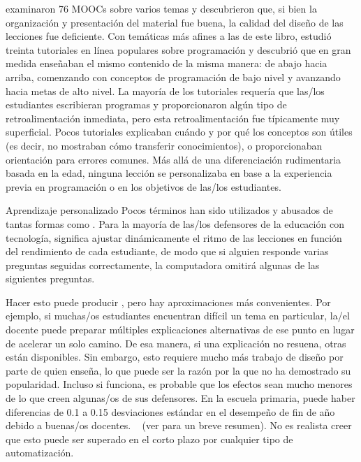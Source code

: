 \cite{Marg2015} examinaron 76 MOOCs sobre varios temas y descubrieron que,
si bien la organización y presentación del material fue buena,
la calidad del diseño de las lecciones fue deficiente.
Con temáticas más afines a las de este libro,
\cite{Kim2017} estudió treinta tutoriales en línea populares sobre programación
y descubrió que en gran medida enseñaban el mismo contenido de la misma manera:
de abajo hacia arriba,
comenzando con conceptos de programación de bajo nivel y avanzando hacia metas de alto nivel.
La mayoría de los tutoriales requería que las/los estudiantes escribieran programas y proporcionaron algún tipo de retroalimentación inmediata,
pero esta retroalimentación fue típicamente muy superficial.
Pocos tutoriales explicaban cuándo y por qué los conceptos son útiles
(es decir, no mostraban cómo transferir conocimientos),
o proporcionaban orientación para errores comunes.
Más allá de una diferenciación rudimentaria basada en la edad,
ninguna lección se personalizaba en base a la experiencia previa en programación o en los objetivos de las/los estudiantes.

\begin{aside}{Aprendizaje personalizado}
  Pocos términos han sido utilizados y abusados de tantas formas
  como .
  Para la mayoría de las/los defensores de la educación con tecnología,
  significa ajustar dinámicamente el ritmo de las lecciones en función del rendimiento de cada estudiante,
  de modo que si alguien responde varias preguntas seguidas correctamente,
  la computadora omitirá algunas de las siguientes preguntas.

  Hacer esto puede producir
  ,
  pero hay aproximaciones más convenientes.
  Por ejemplo,
  si muchas/os estudiantes encuentran difícil un tema en particular,
  la/el docente puede preparar múltiples explicaciones alternativas de ese punto
  en lugar de acelerar un solo camino.
  De esa manera,
  si una explicación no resuena,
  otras están disponibles.
  Sin embargo,
  esto requiere mucho más trabajo de diseño por parte de quien enseña,
  lo que puede ser la razón por la que no ha demostrado su popularidad.
  Incluso si funciona,
  es probable que los efectos sean mucho menores de lo que creen algunas/os de sus defensores.
  En la escuela primaria,
  puede haber diferencias de 0.1 a 0.15 desviaciones estándar en el desempeño de fin de año debido a buenas/os docentes.
  ~\cite{Chet2014}
  (ver  para un breve resumen).
  No es realista creer que esto puede ser superado en el corto plazo por cualquier tipo de automatización.
\end{aside}

